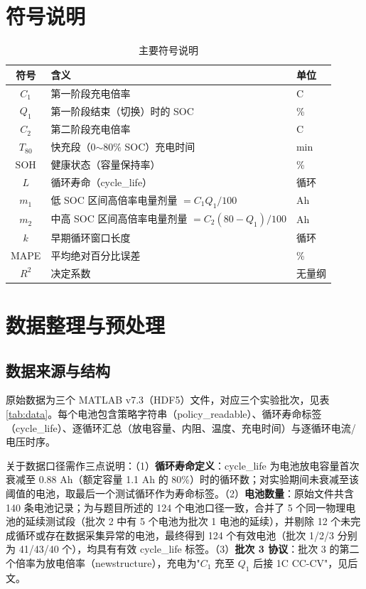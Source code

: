 \documentclass[withoutpreface]{cumcmthesis}
\begin{document}
\section{符号说明}

\begin{table}[H]
\centering
\caption{主要符号说明}
\label{tab:symbol}
\begin{tabular}{cll}
\toprule
符号 & 含义 & 单位 \\
\midrule
$C_1$ & 第一阶段充电倍率 & C \\
$Q_1$ & 第一阶段结束（切换）时的 SOC & \% \\
$C_2$ & 第二阶段充电倍率 & C \\
$T_{80}$ & 快充段（0$\sim$80\% SOC）充电时间 & min \\
$\mathrm{SOH}$ & 健康状态（容量保持率） & \% \\
$L$ & 循环寿命（cycle\_life） & 循环 \\
$m_1$ & 低 SOC 区间高倍率电量剂量 $=C_1Q_1/100$ & Ah \\
$m_2$ & 中高 SOC 区间高倍率电量剂量 $=C_2(80-Q_1)/100$ & Ah \\
$k$ & 早期循环窗口长度 & 循环 \\
MAPE & 平均绝对百分比误差 & \% \\
$R^2$ & 决定系数 & 无量纲 \\
\bottomrule
\end{tabular}
\end{table}

\section{数据整理与预处理}

\subsection{数据来源与结构}

原始数据为三个 MATLAB v7.3（HDF5）文件，对应三个实验批次，见表 \ref{tab:data}。每个电池包含策略字符串（policy\_readable）、循环寿命标签（cycle\_life）、逐循环汇总（放电容量、内阻、温度、充电时间）与逐循环电流/电压时序。

关于数据口径需作三点说明：（1）\textbf{循环寿命定义}：cycle\_life 为电池放电容量首次衰减至 0.88 Ah（额定容量 1.1 Ah 的 80\%）时的循环数；对实验期间未衰减至该阈值的电池，取最后一个测试循环作为寿命标签。（2）\textbf{电池数量}：原始文件共含 140 条电池记录；为与题目所述的 124 个电池口径一致，合并了 5 个同一物理电池的延续测试段（批次 2 中有 5 个电池为批次 1 电池的延续），并剔除 12 个未完成循环或存在数据采集异常的电池，最终得到 124 个有效电池（批次 1/2/3 分别为 41/43/40 个），均具有有效 cycle\_life 标签。（3）\textbf{批次 3 协议}：批次 3 的第二个倍率为放电倍率（newstructure），充电为"$C_1$ 充至 $Q_1$ 后接 1C CC-CV"，见后文。
\end{document}
